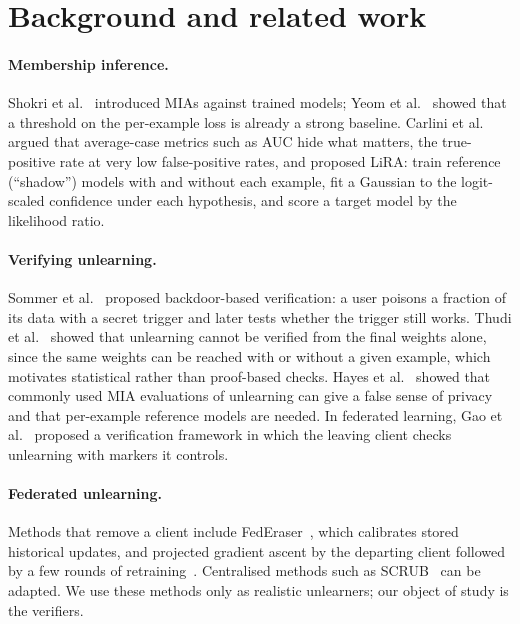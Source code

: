 \documentclass[11pt]{article}
\begin{document}
\section{Background and related work}

\paragraph{Membership inference.} Shokri et al.~\cite{shokri2017} introduced
MIAs against trained models; Yeom et al.~\cite{yeom2018} showed that a
threshold on the per-example loss is already a strong baseline. Carlini et
al.~\cite{carlini2022} argued that average-case metrics such as AUC hide what
matters, the true-positive rate at very low false-positive rates, and proposed
LiRA: train reference (``shadow'') models with and without each example, fit a
Gaussian to the logit-scaled confidence under each hypothesis, and score a
target model by the likelihood ratio.

\paragraph{Verifying unlearning.} Sommer et al.~\cite{sommer2022} proposed
backdoor-based verification: a user poisons a fraction of its data with a
secret trigger and later tests whether the trigger still works. Thudi et
al.~\cite{thudi2022} showed that unlearning cannot be verified from the final
weights alone, since the same weights can be reached with or without a given
example, which motivates statistical rather than proof-based checks. Hayes et
al.~\cite{hayes2024} showed that commonly used MIA evaluations of unlearning
can give a false sense of privacy and that per-example reference models are
needed. In federated learning, Gao et al.~\cite{gao2022verifi} proposed a
verification framework in which the leaving client checks unlearning with
markers it controls.

\paragraph{Federated unlearning.} Methods that remove a client include
FedEraser~\cite{liu2021federaser}, which calibrates stored historical updates,
and projected gradient ascent by the departing client followed by a few rounds
of retraining~\cite{halimi2022}. Centralised methods such as
SCRUB~\cite{kurmanji2023} can be adapted. We use these methods only as
realistic unlearners; our object of study is the verifiers.
\end{document}

